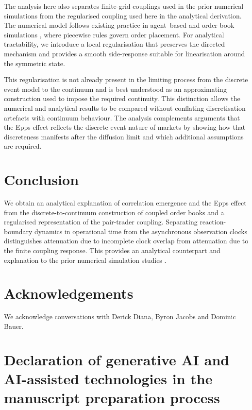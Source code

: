 \documentclass[5p,final]{elsarticle}
\begin{document}
The analysis here also separates finite-grid couplings used in the prior numerical simulations from the regularised coupling used here in the analytical derivation. The numerical model follows existing practice in agent--based \cite{dicksetal2024} and order-book simulations \cite{DianaGebbie2025}, where piecewise rules govern order placement. For analytical tractability, we introduce a local regularisation that preserves the directed mechanism and provides a smooth side-response suitable for linearisation around the symmetric state. 

This regularisation is not already present in the limiting process from the discrete event model to the continuum and is best understood as an approximating construction used to impose the required continuity. This distinction allows the numerical and analytical results to be compared without conflating discretisation artefacts with continuum behaviour. The analysis complements arguments that the Epps effect reflects the discrete-event nature of markets \citep{chang2025discrete} by showing how that discreteness manifests after the diffusion limit and which additional assumptions are required.

\section{Conclusion}

We obtain an analytical explanation of correlation emergence and the Epps effect from the discrete-to-continuum construction of coupled order books and a regularised representation of the pair-trader coupling. Separating reaction-boundary dynamics in operational time from the asynchronous observation clocks distinguishes attenuation due to incomplete clock overlap from attenuation due to the finite coupling response. This provides an analytical counterpart and explanation to the prior numerical simulation studies \citep{BauerDianaGebbie2024,DianaGebbie2025}.

\section*{Acknowledgements}

We acknowledge conversations with Derick Diana, Byron Jacobs and Dominic Bauer.

\section*{Declaration of generative AI and AI-assisted technologies in the manuscript preparation process}
\end{document}
